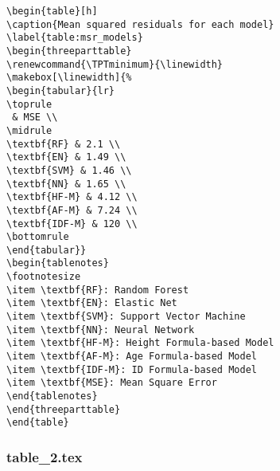 \documentclass[11pt]{article}
\begin{document}
\begin{Verbatim}[tabsize=4]
\begin{table}[h]
\caption{Mean squared residuals for each model}
\label{table:msr_models}
\begin{threeparttable}
\renewcommand{\TPTminimum}{\linewidth}
\makebox[\linewidth]{%
\begin{tabular}{lr}
\toprule
 & MSE \\
\midrule
\textbf{RF} & 2.1 \\
\textbf{EN} & 1.49 \\
\textbf{SVM} & 1.46 \\
\textbf{NN} & 1.65 \\
\textbf{HF-M} & 4.12 \\
\textbf{AF-M} & 7.24 \\
\textbf{IDF-M} & 120 \\
\bottomrule
\end{tabular}}
\begin{tablenotes}
\footnotesize
\item \textbf{RF}: Random Forest
\item \textbf{EN}: Elastic Net
\item \textbf{SVM}: Support Vector Machine
\item \textbf{NN}: Neural Network
\item \textbf{HF-M}: Height Formula-based Model
\item \textbf{AF-M}: Age Formula-based Model
\item \textbf{IDF-M}: ID Formula-based Model
\item \textbf{MSE}: Mean Square Error
\end{tablenotes}
\end{threeparttable}
\end{table}

\end{Verbatim}

\subsubsection*{table\_2.tex}
\end{document}

